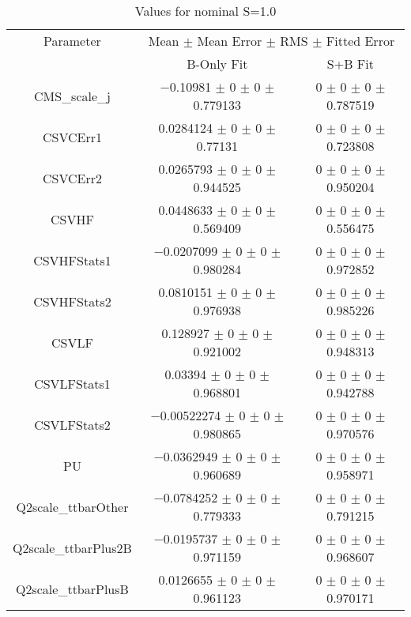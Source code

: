 \begin{table}
\centering
\caption{Values for nominal S=1.0}
\begin{tabular}{ccc}
\toprule
Parameter & \multicolumn{2}{c}{Mean $\pm$ Mean Error $\pm$ RMS $\pm$ Fitted Error}\\
 & B-Only Fit & S+B Fit\\
\midrule
CMS\_scale\_j & \num{-0.10981} $\pm$ \num{0} $\pm$ \num{0} $\pm$ \num{0.779133} & \num{0} $\pm$ \num{0} $\pm$ \num{0} $\pm$ \num{0.787519}\\
CSVCErr1 & \num{0.0284124} $\pm$ \num{0} $\pm$ \num{0} $\pm$ \num{0.77131} & \num{0} $\pm$ \num{0} $\pm$ \num{0} $\pm$ \num{0.723808}\\
CSVCErr2 & \num{0.0265793} $\pm$ \num{0} $\pm$ \num{0} $\pm$ \num{0.944525} & \num{0} $\pm$ \num{0} $\pm$ \num{0} $\pm$ \num{0.950204}\\
CSVHF & \num{0.0448633} $\pm$ \num{0} $\pm$ \num{0} $\pm$ \num{0.569409} & \num{0} $\pm$ \num{0} $\pm$ \num{0} $\pm$ \num{0.556475}\\
CSVHFStats1 & \num{-0.0207099} $\pm$ \num{0} $\pm$ \num{0} $\pm$ \num{0.980284} & \num{0} $\pm$ \num{0} $\pm$ \num{0} $\pm$ \num{0.972852}\\
CSVHFStats2 & \num{0.0810151} $\pm$ \num{0} $\pm$ \num{0} $\pm$ \num{0.976938} & \num{0} $\pm$ \num{0} $\pm$ \num{0} $\pm$ \num{0.985226}\\
CSVLF & \num{0.128927} $\pm$ \num{0} $\pm$ \num{0} $\pm$ \num{0.921002} & \num{0} $\pm$ \num{0} $\pm$ \num{0} $\pm$ \num{0.948313}\\
CSVLFStats1 & \num{0.03394} $\pm$ \num{0} $\pm$ \num{0} $\pm$ \num{0.968801} & \num{0} $\pm$ \num{0} $\pm$ \num{0} $\pm$ \num{0.942788}\\
CSVLFStats2 & \num{-0.00522274} $\pm$ \num{0} $\pm$ \num{0} $\pm$ \num{0.980865} & \num{0} $\pm$ \num{0} $\pm$ \num{0} $\pm$ \num{0.970576}\\
PU & \num{-0.0362949} $\pm$ \num{0} $\pm$ \num{0} $\pm$ \num{0.960689} & \num{0} $\pm$ \num{0} $\pm$ \num{0} $\pm$ \num{0.958971}\\
Q2scale\_ttbarOther & \num{-0.0784252} $\pm$ \num{0} $\pm$ \num{0} $\pm$ \num{0.779333} & \num{0} $\pm$ \num{0} $\pm$ \num{0} $\pm$ \num{0.791215}\\
Q2scale\_ttbarPlus2B & \num{-0.0195737} $\pm$ \num{0} $\pm$ \num{0} $\pm$ \num{0.971159} & \num{0} $\pm$ \num{0} $\pm$ \num{0} $\pm$ \num{0.968607}\\
Q2scale\_ttbarPlusB & \num{0.0126655} $\pm$ \num{0} $\pm$ \num{0} $\pm$ \num{0.961123} & \num{0} $\pm$ \num{0} $\pm$ \num{0} $\pm$ \num{0.970171}\\

\end{tabular}
\end{table}
